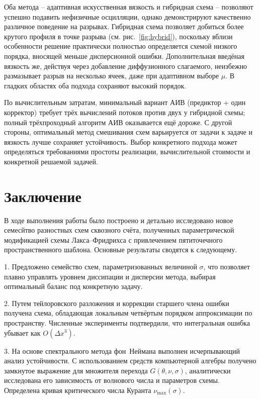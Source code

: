 \documentclass[14pt]{report}
\begin{document}
Оба метода -- адаптивная искусственная вязкость и гибридная схема -- позволяют успешно подавить нефизичные осцилляции, однако демонстрируют качественно различное поведение на разрывах. Гибридная схема позволяет добиться более крутого профиля в точке разрыва (см. рис.~\ref{fig:hybrid}), поскольку вблизи особенности решение практически полностью определяется схемой низкого порядка, вносящей меньше дисперсионной ошибки. Дополнительная введёная вязкость же, действуя через добавление диффузионного слагаемого, неизбежно размазывает разрыв на несколько ячеек, даже при адаптивном выборе $\mu$. В гладких областях оба подхода сохраняют высокий порядок.

По вычислительным затратам, минимальный вариант АИВ (предиктор + один корректор) требует трёх вычислений потоков против двух у гибридной схемы; полный трёхпроходный алгоритм АИВ оказывается ещё дороже. С другой стороны, оптимальный метод смешивания схем варьируется от задачи к задаче и вязкость лучше сохраняет устойчивость. Выбор конкретного подхода может определяться требованиями простоты реализации, вычислительной стоимости и конкретной решаемой задачей.

\chapter{Заключение}
\label{sec:conclusion}

В ходе выполнения работы было построено и детально исследовано новое семесйтво разностных схем сквозного счёта, полученных параметрической модификацией схемы Лакса--Фридрихса с привлечением пятиточечного пространственного шаблона. Основные результаты сводятся к следующему.

1. Предложено семейство схем, параметризованных величиной $\sigma$, что позволяет плавно управлять уровнем диссипации и дисперсии метода, выбирая оптимальный баланс под конкретную задачу.

2. Путем тейлоровского разложения и коррекции старшего члена ошибки получена схема, обладающая локальным четвёртым порядком аппроксимации по пространству. Численные эксперименты подтвердили, что интегральная ошибка убывает как $O(\Delta x^3)$.

3. На основе спектрального метода фон~\mbox{Неймана} выполнен исчерпывающий анализ устойчивости. С использованием средств компьютерной алгебры получено замкнутое выражение для множителя перехода $G(\theta,\nu,\sigma)$, аналитически исследована его зависимость от волнового числа и параметров схемы. Определена кривая критического числа Куранта $\nu_{\max}(\sigma)$.
\end{document}
